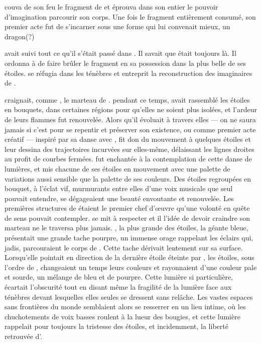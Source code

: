 \Ogo couva de son feu le fragment de \Drisst et éprouva dans son entier le pouvoir d'imagination parcourir son corps. Une fois le fragment entièrement consumé, son premier acte fut de s'incarner sous une forme qui lui convenait mieux, un dragon(?)


\Cind avait suivi tout ce qu'il s'était passé dans \Dreyma. Il savait que \Ogo était toujours là. Il ordonna à \Carac de faire brûler le fragment en sa possession dans la plus belle de ses étoiles. \Shuru se réfugia dans les ténèbres et entreprit la reconstruction des imaginaires de \Mey. 

\Ogo craignait, comme \Shuru, le marteau de \Carac. \Carac pendant ce temps, avait rassemblé les étoiles en bouquets, dans certaines régions pour qu'elles ne soient plus isolées, et l'ardeur de leurs flammes fut renouvelée. Alors qu'il évoluait à travers elles --- on ne saura jamais si c'est pour se repentir et préserver son existence, ou comme premier acte créatif --- inspiré par sa danse avec \Drisst, \Ogo fit don du mouvement à quelques étoiles et leur dessina des trajectoires incurvées sur elles-même, délaissant les lignes droites au profit de courbes fermées. \Carac fut enchantée à la contemplation de cette danse de lumières, et mis chacune de ses étoiles en mouvement avec une palette de variations aussi sensible que la palette de ses couleurs. Des étoiles regroupées en bouquet, à l'éclat vif, murmurants entre elles d'une voix musicale que seul \Carac pouvait entendre, se dégageaient une beauté envoutante et renouvelée. Les premières structures de \Dreyma étaient le premier chef d'œuvre qu'une volonté en quête de sens pouvait contempler. \Ogo se mit à respecter \Carac et il l'idée de devoir craindre son marteau ne le traversa plus jamais. \Boromil, la plus grande des étoiles, la géante bleue, présentait une grande tache pourpre, un immense orage rappelant les éclairs qui, jadis, parcouraient le corps de \Boromu. Cette tache dérivait lentement sur sa surface. Lorsqu'elle pointait en direction de la dernière étoile éteinte par \Shuru, les étoiles, sous l'ordre de \Carac, changeaient un temps leurs couleurs et rayonnaient d'une couleur pale et sourde, un mélange de bleu et de pourpre. Cette lumière si particulière, écartait l'obscurité tout en disant même la fragilité de la lumière face aux ténèbres devant lesquelles elles seules se dressent sans relâche. Les vastes espaces sans frontières du monde semblaient alors se resserrer en un lieu intime, où les chuchotements de voix basses roulent à la lueur des bougies, et cette lumière rappelait pour toujours la tristesse des étoiles, et incidemment, la liberté retrouvée d'\Ogo.

